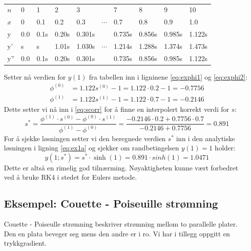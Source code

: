 \begin{table}[H]
  \centering
  \caption{}
  \label{tab:ex1beregn}
  \begin{tabularx}{1.0\textwidth}{X|XXXXXXXXX}
    \toprule
    $n$ & 0   & 1    & 2      & 3      &          & 7      & 8     & 9     & 10    \\
    $x$ & 0   & 0.1  & 0.2    & 0.3    & $\cdots$ & 0.7    & 0.8   & 0.9   & 1.0   \\
    \midrule
    y   & 0.0 & 0.1s & 0.20s  & 0.301s &          & 0.735s & 0.856s & 0.985s & 1.122s \\
    y'  & s   & s    & 1.01s  & 1.030s & $\cdots$ & 1.214s & 1.288s & 1.374s & 1.473s \\
    y'' & 0.0 & 0.1s & 0.20s  & 0.301s &          & 0.735s & 0.856s & 0.985s & 1.122s \\
    \bottomrule
  \end{tabularx}
\end{table}

\noindent Setter nå verdien for $y(1)$ fra tabellen inn i ligninene \eqref{eq:exphi1} og \eqref{eq:exphi2}:
\begin{align}
  \phi^{(0)} &= 1.122s^{(0)} - 1 = 1.122 \cdot 0.2 - 1 = -0.7756 \\
  \phi^{(1)} &= 1.122s^{(1)} - 1 = 1.122 \cdot 0.7 - 1 = -0.2146
\end{align}
Dette setter vi nå inn i \eqref{eq:scorr} for å finne en interpolert korrekt verdi for $s$:
\begin{equation}
  s^* = \dfrac{\phi^{(1)}\cdot s^{(0)} - \phi^{(0)}\cdot s^{(1)}}{\phi^{(1)} - \phi^{(0)}}
      = \frac{-0.2146 \cdot 0.2 + 0.7756 \cdot 0.7}{-0.2146+0.7756} = 0.891
\end{equation}
For å sjekke løsningen setter vi den beregnede verdien $s^*$ inn i den analytiske løsningen i ligning \eqref{eq:ex1a} og sjekker om randbetingelsen $y(1) = 1$ holder:
\begin{equation}
  y(1;s^*) = s^* \cdot \sinh(1) = 0.891 \cdot sinh(1) = 1.0471
\end{equation}
Dette er altså en rimelig god tilnærming. Nøyaktigheten kunne vært forbedret ved å bruke RK4 i stedet for Eulers metode.


\subsection{Eksempel: Couette - Poiseuille strømning} %
\label{sub:eksempel_couette_poiseuille_str_mning}
Couette - Poiseulle strømning beskriver strømning mellom to parallelle plater. Den en plata beveger seg mens den andre er i ro. Vi har i tillegg oppgitt en trykkgradient.





\clearpage



